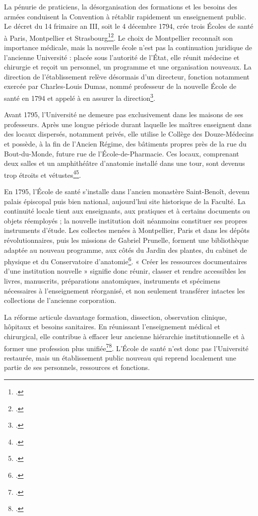 La pénurie de praticiens, la désorganisation des formations et les besoins des armées conduisent la Convention à rétablir rapidement un enseignement public. Le décret du 14 frimaire an III, soit le 4 décembre 1794, crée trois Écoles de santé à Paris, Montpellier et Strasbourg\footcite[art.~I, p.~402]{DecretEcoles1794}\footcite{Brockliss1989EnseignementMedical}. Le choix de Montpellier reconnaît son importance médicale, mais la nouvelle école n'est pas la continuation juridique de l'ancienne Université : placée sous l'autorité de l'État, elle réunit médecine et chirurgie et reçoit un personnel, un programme et une organisation nouveaux. La direction de l'établissement relève désormais d'un directeur, fonction notamment exercée par Charles-Louis Dumas, nommé professeur de la nouvelle École de santé en 1794 et appelé à en assurer la direction\footcite{Condette2006Dumas}.

Avant 1795, l'Université ne demeure pas exclusivement dans les maisons de ses professeurs. Après une longue période durant laquelle les maîtres enseignent dans des locaux dispersés, notamment privés, elle utilise le Collège des Douze-Médecins et possède, à la fin de l'Ancien Régime, des bâtiments propres près de la rue du Bout-du-Monde, future rue de l'École-de-Pharmacie. Ces locaux, comprenant deux salles et un amphithéâtre d'anatomie installé dans une tour, sont devenus trop étroits et vétustes\footcite{Dulieu1955VieMedicale}\footcite{LavabreBertrand2021Esprit}.

En 1795, l'École de santé s'installe dans l'ancien monastère Saint-Benoît, devenu palais épiscopal puis bien national, aujourd'hui site historique de la Faculté. La continuité locale tient aux enseignants, aux pratiques et à certains documents ou objets réemployés ; la nouvelle institution doit néanmoins constituer ses propres instruments d'étude. Les collectes menées à Montpellier, Paris et dans les dépôts révolutionnaires, puis les missions de Gabriel Prunelle, forment une bibliothèque adaptée au nouveau programme, aux côtés du Jardin des plantes, du cabinet de physique et du Conservatoire d'anatomie\footcite{Denton2022Bibliotheque}. « Créer les ressources documentaires d'une institution nouvelle » signifie donc réunir, classer et rendre accessibles les livres, manuscrits, préparations anatomiques, instruments et spécimens nécessaires à l'enseignement réorganisé, et non seulement transférer intactes les collections de l'ancienne corporation.

La réforme articule davantage formation, dissection, observation clinique, hôpitaux et besoins sanitaires. En réunissant l'enseignement médical et chirurgical, elle contribue à effacer leur ancienne hiérarchie institutionnelle et à former une profession plus unifiée\footcite{HuardImbaultHuart1973}\footcite{Brockliss1989EnseignementMedical}. L'École de santé n'est donc pas l'Université restaurée, mais un établissement public nouveau qui reprend localement une partie de ses personnels, ressources et fonctions.

